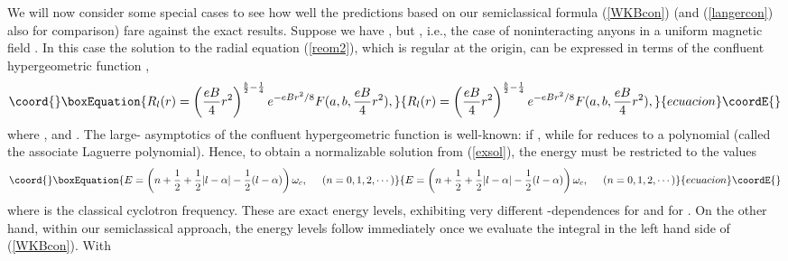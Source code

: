 \documentclass[a4paper,aps,eqsecnum,preprint,preprintnumbers,12pt]{revtex4}
\begin{document}
We will now consider some special cases to see how well the
predictions based on our semiclassical formula (\ref{WKBcon}) (and
(\ref{langercon}) also for comparison) fare against the exact
results. Suppose we have \coordHE{}, but \coordHE{}, i.e., the case
of noninteracting anyons in a uniform magnetic field
\cite{johnson, khare}. In this case the solution to the radial
equation (\ref{reom2}), which is regular at the origin, can be
expressed in terms of the confluent hypergeometric function
\cite{landau},
\begin{equation}\coord{}\boxEquation{ \label{exsol}
R_{l}(r) = \left( \frac{eB}{4} r^{2} \right)^{ \frac{b}{2} -
\frac{1}{4} } e^{ - eBr^{2}/8 } F(a, b, \frac{eB}{4} r^{2}),
}{ R_{l}(r) = \left( \frac{eB}{4} r^{2} \right)^{ \frac{b}{2} -
\frac{1}{4} } e^{ - eBr^{2}/8 } F(a, b, \frac{eB}{4} r^{2}),
}{ecuacion}\coordE{}\end{equation}
where \coordHE{}, and \coordHE{}. The large-\coordHE{}
asymptotics of the confluent hypergeometric function \coordHE{} is
well-known: \coordHE{} if \coordHE{}, while \coordHE{} for \coordHE{} reduces to a
polynomial (called the associate Laguerre polynomial). Hence, to
obtain a normalizable solution from (\ref{exsol}), the energy \coordHE{}
must be restricted to the values
\begin{equation}\coord{}\boxEquation{ \label{exharm}
E = \left( n + \frac{1}{2} + \frac{1}{2} |l-\alpha| - \frac{1}{2}
(l-\alpha) \right) \omega_{c}, \;\;\;\;\; ( n = 0, 1, 2, \cdots )
}{ E = \left( n + \frac{1}{2} + \frac{1}{2} |l-\alpha| - \frac{1}{2}
(l-\alpha) \right) \omega_{c}, \;\;\;\;\; ( n = 0, 1, 2, \cdots )
}{ecuacion}\coordE{}\end{equation}
where \coordHE{} is the
classical cyclotron frequency. These are exact energy levels,
exhibiting very different \coordHE{}-dependences for \coordHE{} and for \coordHE{}
\cite{khare, johnson}. On the other hand, within our semiclassical
approach, the energy levels follow immediately once we evaluate
the integral in the left hand side of (\ref{WKBcon}). With
\end{document}
